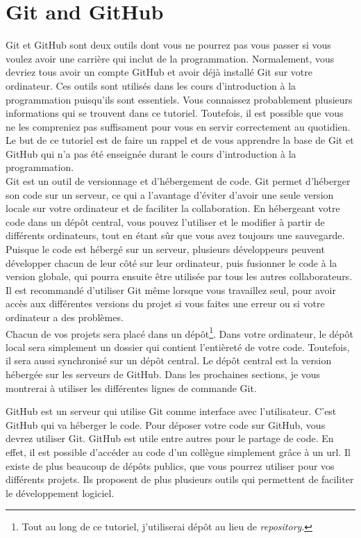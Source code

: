 \documentclass{book}
\begin{document}
\setlength{\parindent}{0cm}
\chapter{Git and GitHub}

Git et GitHub sont deux outils dont vous ne pourrez pas vous passer si vous voulez avoir une carrière qui inclut de la programmation. Normalement, vous devriez tous avoir un compte GitHub et avoir déjà installé Git sur votre ordinateur. Ces outils sont utilisés dans les cours d'introduction à la programmation puisqu'ils sont essentiels. Vous connaissez probablement plusieurs informations qui se trouvent dans ce tutoriel. Toutefois, il est possible que vous ne les compreniez pas suffisament pour vous en servir correctement au quotidien. Le but de ce tutoriel est de faire un rappel et de vous apprendre la base de Git et GitHub qui n'a pas été enseignée durant le cours d'introduction à la programmation. \\

Git est un outil de versionnage et d'hébergement de code. Git permet d'héberger son code sur un serveur, ce qui a l'avantage d'éviter d'avoir une seule version locale sur votre ordinateur et de faciliter la collaboration. En hébergeant votre code dans un dépôt central, vous pouvez l'utiliser et le modifier à partir de différents ordinateurs, tout en étant sûr que vous avez toujours une sauvegarde. Puisque le code est hébergé sur un serveur, plusieurs développeurs peuvent développer chacun de leur côté sur leur ordinateur, puis fusionner le code à la version globale, qui pourra ensuite être utilisée par tous les autres collaborateurs. Il est recommandé d'utiliser Git même lorsque vous travaillez seul, pour avoir accès aux différentes versions du projet si vous faites une erreur ou si votre ordinateur a des problèmes. \\

Chacun de vos projets sera placé dans un dépôt\footnote{Tout au long de ce tutoriel, j'utiliserai dépôt au lieu de \emph{repository}.}. Dans votre ordinateur, le dépôt local sera simplement un dossier qui contient l'entièreté de votre code. Toutefois, il sera aussi synchronisé sur un dépôt central. Le dépôt central est la version hébergée sur les serveurs de GitHub. Dans les prochaines sections, je vous montrerai à utiliser les différentes lignes de commande Git. 

GitHub est un serveur qui utilise Git comme interface avec l'utilisateur. C'est GitHub qui va héberger le code. Pour déposer votre code sur GitHub, vous devrez utiliser Git. GitHub est utile entre autres pour le partage de code. En effet, il est possible d'accéder au code d'un collègue simplement grâce à un url. Il existe de plus beaucoup de dépôts publics, que vous pourrez utiliser pour vos différents projets. Ils proposent de plus plusieurs outils qui permettent de faciliter le développement logiciel. 
\end{document}
